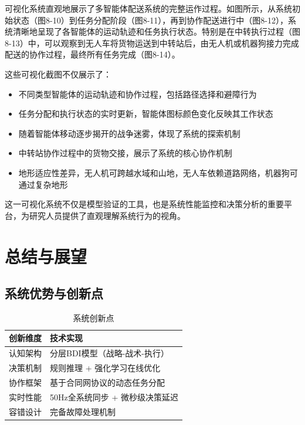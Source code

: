 \documentclass[12pt,a4paper]{article}
\begin{document}
可视化系统直观地展示了多智能体配送系统的完整运作过程。如图所示，从系统初始状态（图8-10）到任务分配阶段（图8-11），再到协作配送进行中（图8-12），系统清晰地呈现了各智能体的运动轨迹和任务执行状态。特别是在中转执行过程（图8-13）中，可以观察到无人车将货物运送到中转站后，由无人机或机器狗接力完成配送的协作过程，最终所有任务完成（图8-14）。

这些可视化截图不仅展示了：
\begin{itemize}
    \item 不同类型智能体的运动轨迹和协作过程，包括路径选择和避障行为
    \item 任务分配和执行状态的实时更新，智能体图标颜色变化反映其工作状态
    \item 随着智能体移动逐步揭开的战争迷雾，体现了系统的探索机制
    \item 中转站协作过程中的货物交接，展示了系统的核心协作机制
    \item 地形适应性差异，无人机可跨越水域和山地，无人车依赖道路网络，机器狗可通过复杂地形
\end{itemize}

这一可视化系统不仅是模型验证的工具，也是系统性能监控和决策分析的重要平台，为研究人员提供了直观理解系统行为的视角。

\section{总结与展望}

\subsection{系统优势与创新点}

\begin{table}[h]
\centering
\caption{系统创新点}
\label{tab:innovation-points}
\begin{tabular}{|>{\centering\arraybackslash}p{4cm}|>{\raggedright\arraybackslash}p{8cm}|}
\hline
\textbf{创新维度} & \textbf{技术实现} \\
\hline
\rowcolor{lightgray}
认知架构 & 分层BDI模型（战略-战术-执行） \\
\hline
决策机制 & 规则推理 + 强化学习在线优化 \\
\hline
\rowcolor{lightgray}
协作框架 & 基于合同网协议的动态任务分配 \\
\hline
实时性能 & 50Hz全系统同步 + 微秒级决策延迟 \\
\hline
\rowcolor{lightgray}
容错设计 & 完备故障处理机制 \\
\hline
\end{tabular}
\end{table}
\end{document}
